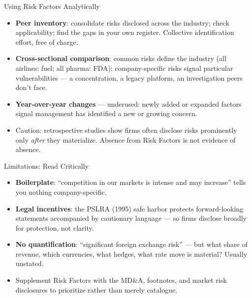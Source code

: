 \documentclass[11pt, aspectratio=169]{beamer}
\begin{document}
\begin{frame}{Using Risk Factors Analytically}
\begin{itemize}
  \item \textbf{Peer inventory}: consolidate risks disclosed across the industry; check applicability; find the gaps in your own register. Collective identification effort, free of charge.
  \item \textbf{Cross-sectional comparison}: common risks define the industry (all airlines: fuel; all pharma: FDA); \alert{company-specific risks} signal particular vulnerabilities --- a concentration, a legacy platform, an investigation peers don't face.
  \item \textbf{Year-over-year changes} --- underused: newly added or expanded factors signal management has identified a new or growing concern.
  \item Caution: retrospective studies show firms often disclose risks prominently only \emph{after} they materialize. Absence from Risk Factors is not evidence of absence.
\end{itemize}
\end{frame}

\begin{frame}{Limitations: Read Critically}
\begin{itemize}
  \item \textbf{Boilerplate}: ``competition in our markets is intense and may increase'' tells you nothing company-specific.
  \item \textbf{Legal incentives}: the PSLRA (1995) safe harbor protects forward-looking statements accompanied by cautionary language --- so firms disclose broadly for protection, not clarity.
  \item \textbf{No quantification}: ``significant foreign exchange risk'' --- but what share of revenue, which currencies, what hedges, what rate move is material? Usually unstated.
  \item Supplement Risk Factors with the MD\&A, footnotes, and market risk disclosures to prioritize rather than merely catalogue.
\end{itemize}
\end{frame}
\end{document}
